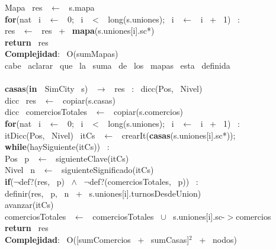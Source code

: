 \begin{Algoritmos}
\indent Mapa \ res \ $\leftarrow$ \ s.mapa\\
\indent \textbf{for}(nat \ i \ $\leftarrow$ \ 0; \ i \ $<$ \ long(s.uniones); \ i \ $\leftarrow$ \ i \ + \ 1) \ : \ \\
\indent \indent res \ $\leftarrow$ \ res \ + \ \textbf{mapa}(s.uniones[i].sc*)\\
\indent \textbf{return} \ res\\
\textbf{Complejidad}: \ O(sumMapas) \ \\
cabe \ aclarar \ que \ la \ suma \ de \ los \ mapas \ esta \ definida\\
\noindent\makebox[\linewidth]{\rule{\textwidth}{0.4pt}}
\\
\noindent\makebox[\linewidth]{\rule{\textwidth}{0.4pt}}
\textbf{casas}(\textbf{in \ }SimCity \ s) \ $\rightarrow $ \ res \ : \ dicc(Pos, \ Nivel)\\
\indent dicc \ res \ $\leftarrow$ \ copiar(s.casas)\\
\indent dicc \ comerciosTotales \ $\leftarrow$ \ copiar(s.comercios)\\
\indent \textbf{for}(nat \ i \ $\leftarrow$ \ 0; \ i \ $<$ \ long(s.uniones); \ i \ $\leftarrow$ \ i \ + \ 1) \ : \ \\
\indent \indent itDicc(Pos, \ Nivel) \ itCs \ $\leftarrow$ \ crearIt(\textbf{casas}(s.uniones[i].sc*));\\
\indent \indent \textbf{while}(haySiguiente(itCs)) \ :\\
\indent \indent \indent Pos \ p \ $\leftarrow$ \ siguienteClave(itCs)\\
\indent \indent \indent Nivel \ n \ $\leftarrow$ \ siguienteSignificado(itCs)\\
\indent \indent \indent \textbf{if}($\neg$def?(res, \ p) \ $\wedge$ \ $\neg$def?(comerciosTotales, \ p)) \ :\\
\indent \indent \indent \indent definir(res, \ p, \ n \ + \ s.uniones[i].turnosDesdeUnion)\\
\indent \indent \indent avanzar(itCs)\\
\indent \indent comerciosTotales \ $\leftarrow$ \ comerciosTotales \ $\cup$ \ s.uniones[i].sc-$>$comercios\\
\indent \textbf{return} \ res\\
\textbf{Complejidad}: \ O([sumComercios \ + \ sumCasas]$^2$ \ + \ nodos)\\
\noindent\makebox[\linewidth]{\rule{\textwidth}{0.4pt}}
\\
\noindent\makebox[\linewidth]{\rule{\textwidth}{0.4pt}}

\end{Algoritmos}
